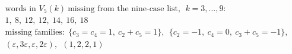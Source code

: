 \documentclass{article}
\begin{document}
\[
\begin{aligned}
&\text{words in }V_5(k)\ \text{missing from the nine-case list},\ \ k=3,\dots,9:\\
&1,\ 8,\ 12,\ 12,\ 14,\ 16,\ 18\\
&\text{missing families:}\ \ \{c_3=c_4=1,\ c_2+c_5=1\},\ \ \{c_2=-1,\ c_4=0,\ c_3+c_5=-1\},\\
&(\varepsilon,3\varepsilon,\varepsilon,2\varepsilon),\ \ (1,2,2,1)
\end{aligned}
\]
\end{document}
